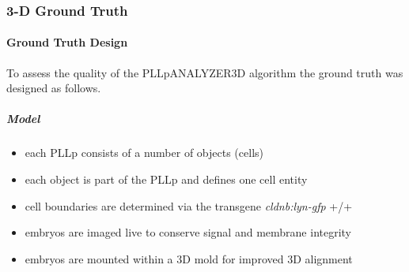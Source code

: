 \documentclass[11pt,singlespacinge,twoside]{reedthesis} %
\providecommand{\tightlist}{%
  \setlength{\itemsep}{0pt}\setlength{\parskip}{0pt}}
\begin{document}
\hypertarget{d-ground-truth-1}{%
\subsubsection{3-D Ground Truth}\label{d-ground-truth-1}}

\hypertarget{ground-truth-design-1}{%
\paragraph{Ground Truth Design}\label{ground-truth-design-1}}

To assess the quality of the PLLpANALYZER3D algorithm the ground truth was designed as follows.

\hypertarget{model-1}{%
\subparagraph{Model}\label{model-1}}
\begin{itemize}
\tightlist
\item
  each PLLp consists of a number of objects (cells)
\item
  each object is part of the PLLp and defines one cell entity
\item
  cell boundaries are determined via the transgene \emph{cldnb:lyn-gfp} +/+
\item
  embryos are imaged live to conserve signal and membrane integrity
\item
  embryos are mounted within a 3D mold for improved 3D alignment
\end{itemize}
\end{document}
